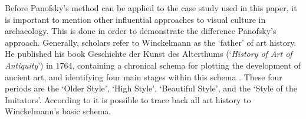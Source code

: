 Before Panofsky’s method can be applied to the case study used in this paper, it is important to mention other influential approaches to visual culture in archaeology. 
This is done in order to demonstrate the difference Panofsky’s approach. Generally, scholars refer to Winckelmann as the ‘father’ of art history. 
He published his book Geschichte der Kunst des Alterthums (‘\emph{History of Art of Antiquity}’) in 1764, containing a chronical schema for plotting the development of ancient art, and identifying four main stages within this schema \parencite[68--69] {BeardHenderson_2001}. 
These four periods are the ‘Older Style’, ‘High Style’, ‘Beautiful Style’, and the ‘Style of the Imitators’. 
According to \textcite {BeardHenderson_2001}  it is possible to trace back all art history to Winckelmann’s basic schema.

